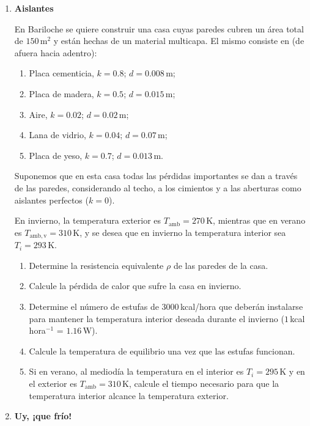 \documentclass[a4paper,12pt]{article}
\begin{document}
\begin{enumerate}
\item{\bf{Aislantes}}

En Bariloche se quiere construir una casa cuyas paredes cubren un área total de
$150$\,m$^2$ y están hechas de un material multicapa. El mismo consiste en (de
afuera hacia adentro):
\begin{enumerate}
\item Placa cementicia, $k=0.8$; $d=0.008$\,m;
\item Placa de madera, $k=0.5$; $d=0.015$\,m;
\item Aire, $k=0.02$; $d=0.02$\,m;
\item Lana de vidrio, $k=0.04$; $d=0.07$\,m;
\item Placa de yeso, $k=0.7$; $d=0.013$\,m.
\end{enumerate}

Suponemos que en esta casa todas las pérdidas importantes se dan a través de
las paredes, considerando al techo, a los cimientos y a las aberturas como
aislantes perfectos ($k=0$).

En invierno, la temperatura exterior es $T_{\mathrm{amb}}=270$\,K, mientras que en
verano es $T_{\mathrm{amb,v}}=310$\,K, y se desea que en invierno la temperatura
interior sea $T_i=293$\,K.

\begin{enumerate}
\item Determine la resistencia equivalente $\rho$ de las paredes de la casa.
\item Calcule la pérdida de calor que sufre la casa en invierno. 
\item Determine el número de estufas de $3000$\,kcal/hora que deberán
instalarse para mantener la temperatura interior deseada durante el invierno
($1$\,kcal\,hora$^{-1}$ = $1.16$\,W).
\item Calcule la temperatura de equilibrio una vez que las estufas funcionan.
\item Si en verano, al mediodía la temperatura en el interior es $T_i=295$\,K y
en el exterior es $T_{\mathrm{amb}}=310$\,K, calcule el tiempo necesario para que la
temperatura interior alcance la temperatura exterior.
\end{enumerate}

\item {\bf{Uy, ¡que frío!}}


\end{enumerate}
\end{document}

